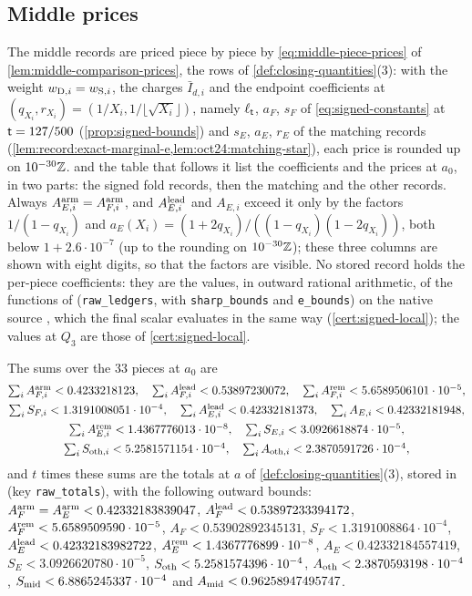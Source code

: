 \subsection{Middle prices}\label{subsec:data:prices}

The middle records are priced piece by piece by
\eqref{eq:middle-piece-prices} of \cref{lem:middle-comparison-prices}, the rows
of \cref{def:closing-quantities}(3): with the weight $w_{{\rm D},i}=w_{{\rm S},i}$,
the charges $\bar I_{d,i}$ and the endpoint coefficients at
$(q_{X_i},r_{X_i})=(1/X_i,1/\lfloor\sqrt{X_i}\rfloor)$, namely $\ell_\mathsf t$, $a_F$,
$s_F$ of \eqref{eq:signed-constants} at $\mathsf t=127/500$
(\cref{prop:signed-bounds}) and $s_E$, $a_E$, $r_E$ of the matching records
(\cref{lem:record:exact-marginal-e,lem:oct24:matching-star}), each price is
rounded up on $10^{-30}\mathbb Z$.  and the table that follows
it list the coefficients and the prices at $a_0$, in two parts: the signed fold
records, then the matching and the other records. Always $A^{\rm arm}_{E,i}=A^{\rm arm}_{F,i}$, and
$A^{\rm lead}_{E,i}$ and $A_{E,i}$ exceed it only by the factors $1/(1-q_{X_i})$
and $a_E(X_i)=(1+2q_{X_i})/((1-q_{X_i})(1-2q_{X_i}))$, both below
$1+2.6\cdot10^{-7}$ (up to the rounding on $10^{-30}\mathbb Z$); these three columns are shown with eight digits, so that the
factors are visible. No stored record holds the per-piece coefficients: they are
the values, in outward rational arithmetic, of the functions of
 (\texttt{raw\_ledgers},
with \texttt{sharp\_bounds} and \texttt{e\_bounds}) on the native source
, which the
final scalar evaluates in the same way (\cref{cert:signed-local}); the values at
$Q_3$ are those of \cref{cert:signed-local}.

The sums over the $33$ pieces at $a_0$ are
\begin{gather*}
 \textstyle\sum_iA^{\rm arm}_{F,i}<0.4233218123,\quad
 \sum_iA^{\rm lead}_{F,i}<0.53897230072,\quad
 \sum_iA^{\rm rem}_{F,i}<5.6589506101\cdot10^{-5},\\
 \textstyle\sum_iS_{F,i}<1.3191008051\cdot10^{-4},\quad
 \sum_iA^{\rm lead}_{E,i}<0.42332181373,\quad
 \sum_iA_{E,i}<0.42332181948,\\
 \textstyle\sum_iA^{\rm rem}_{E,i}<1.4367776013\cdot10^{-8},\quad
 \sum_iS_{E,i}<3.0926618874\cdot10^{-5},\\
 \textstyle\sum_iS_{{\rm oth},i}<5.2581571154\cdot10^{-4},\quad
 \sum_iA_{{\rm oth},i}<2.3870591726\cdot10^{-4},
\end{gather*}
and $t$ times these sums are the totals at $a$ of
\cref{def:closing-quantities}(3), stored in
 (key
\texttt{raw\_totals}), with the following outward bounds:
$A^{\rm arm}_F=A^{\rm arm}_E<0.42332183839047$, $A^{\rm lead}_F<0.53897233394172$,
$A^{\rm rem}_F<5.6589509590\cdot10^{-5}$, $A_F<0.53902892345131$, $S_F<1.3191008864\cdot10^{-4}$,
$A^{\rm lead}_E<0.42332183982722$, $A^{\rm rem}_E<1.4367776899\cdot10^{-8}$, $A_E<0.42332184557419$,
$S_E<3.0926620780\cdot10^{-5}$, $S_{\rm oth}<5.2581574396\cdot10^{-4}$, $A_{\rm oth}<2.3870593198\cdot10^{-4}$,
$S_{\rm mid}<6.8865245337\cdot10^{-4}$ and $A_{\rm mid}<0.96258947495747$.

